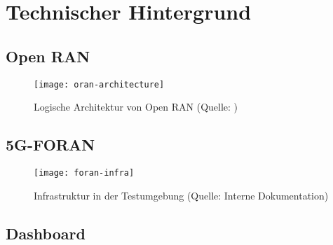 \chapter{Technischer Hintergrund}
\label{chap:technischerHintergrund}
\section{Open RAN}
\label{sec:tech-oran}
\begin{figure}[H]
    \centering
    \texttt{[image: oran-architecture]}
    \caption{Logische Architektur von Open RAN (Quelle: \autocite{o-ranworkgroup1usecasesandoverallarchitectureORANArchitectureDescription2024})}
    \label{fig:oran-architecture}
\end{figure}
\section{5G-FORAN}
\label{sec:tech-foran}
\begin{figure}
    \centering
    \texttt{[image: foran-infra]}
    \caption{Infrastruktur in der Testumgebung (Quelle: Interne Dokumentation)}
    \label{fig:foran-infra}
\end{figure}
\section{Dashboard}
\label{sec:tech-dashboard}

